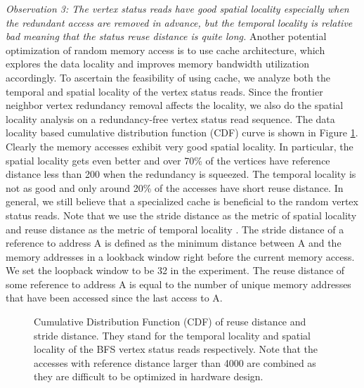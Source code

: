 \textit{Observation 3: The vertex status reads have good 
spatial locality especially when the redundant access are removed in advance, 
but the temporal locality is relative bad meaning that the status reuse 
distance is quite long.}
Another potential optimization of random memory access is to use cache architecture, 
which explores the data locality and improves memory bandwidth utilization 
accordingly. To ascertain the feasibility of using cache, we analyze both the 
temporal and spatial locality of the vertex status reads. Since 
the frontier neighbor vertex redundancy removal affects the locality, 
we also do the spatial locality analysis on a redundancy-free 
vertex status read sequence. The data locality based cumulative 
distribution function (CDF) curve is shown in 
Figure \ref{fig:youtube-locality}. Clearly the memory accesses exhibit 
very good spatial locality. In particular, the spatial 
locality gets even better and over 70\% of the vertices have reference distance 
less than 200 when the redundancy is squeezed. The temporal locality is not as 
good and only around 20\% of the accesses have short reuse distance. In general, 
we still believe that a specialized cache is beneficial to the random 
vertex status reads. Note that we use 
the stride distance as the metric of spatial locality and reuse distance as the metric 
of temporal locality \cite{weinberg2008chameleon}. The stride distance of a reference 
to address A is defined as the minimum distance between A and the 
memory addresses in a lookback window right before the current 
memory access. We set the loopback window to be 32 in the experiment. 
The reuse distance of some reference to 
address A is equal to the number of unique memory addresses that have been 
accessed since the last access to A.  

\begin{figure}
\caption{Cumulative Distribution Function (CDF) of reuse distance 
    and stride distance. They stand for the temporal locality and spatial 
    locality of the BFS vertex status reads respectively. Note that the 
    accesses with reference distance larger than 4000 are combined as they are difficult 
    to be optimized in hardware design.}
\label{fig:youtube-locality}
\vspace{-1.5em}
\end{figure}

